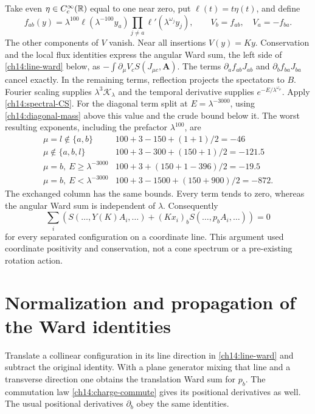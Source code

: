 Take even $\eta\in C_c^\infty(\mathbb R)$ equal to one near zero,
put $\ell(t)=t\eta(t)$, and define
\[
 f_{ab}(y)=\lambda^{100}\ell(\lambda^{-100}y_a)
                \prod_{j\ne a}\ell'(\lambda^{\omega_j}y_j),
 \qquad V_b=f_{ab},\quad V_a=-f_{ba}.
\]
The other components of $V$ vanish. Near all insertions $V(y)=Ky$.
Conservation and the local flux identities express the angular Ward sum, the left side of
\eqref{ch14:line-ward} below, as $-\int\partial_\mu V_c S(J_{\mu c},\boldsymbol A)$.
The terms $\partial_af_{ab}J_{ab}$ and
$\partial_bf_{ba}J_{ba}$ cancel exactly. In the remaining terms,
reflection projects the spectators to $B$. Fourier scaling supplies
$\lambda^3\mathcal K_\lambda$ and the temporal derivative supplies
$e^{-E/\lambda^{\omega_\mu}}$.
Apply \eqref{ch14:spectral-CS}. For the diagonal term split at
$E=\lambda^{-3000}$, using \eqref{ch14:diagonal-mass} above this
value and the crude bound below it. The worst resulting exponents,
including the prefactor $\lambda^{100}$, are
\[
\begin{array}{c|c}
 \mu=l\notin\{a,b\}&100+3-150+(1+1)/2=-46\\
 \mu\notin\{a,b,l\}&100+3-300+(150+1)/2=-121.5\\
 \mu=b,\ E\ge\lambda^{-3000}&100+3+(150+1-396)/2=-19.5\\
 \mu=b,\ E<\lambda^{-3000}&100+3-1500+(150+900)/2=-872.
\end{array}
\]
The exchanged column has the same bounds. Every term tends to zero,
whereas the angular Ward sum is independent of $\lambda$.
Consequently
\begin{equation}\label{ch14:line-ward}
 \sum_i\left(S(\ldots,Y(K)A_i,\ldots)
       +(Kx_i)_bS(\ldots,p_bA_i,\ldots)\right)=0
\end{equation}
for every separated configuration on a coordinate line.
This argument used coordinate positivity and conservation, not a
cone spectrum or a pre-existing rotation action.

\section{Normalization and propagation of the Ward identities}
\label{ch14:propagation}

Translate a collinear configuration in its line direction in
\eqref{ch14:line-ward} and subtract the original identity. With a
plane generator mixing that line and a transverse direction one
obtains the translation Ward sum for $p_b$. The commutation law
\eqref{ch14:charge-commute} gives its positional derivatives as well.
The usual positional derivatives $\partial_b$ obey the same identities.

